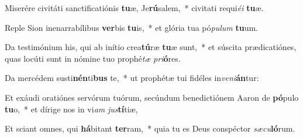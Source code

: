 \item Miserére civitáti sanctificatiónis \textbf{tu}æ, Je\textbf{rú}salem,~* civitati requi\textit{é}\textit{i} \textbf{tu}æ.
\item Reple Sion inenarrabílibus \textbf{ver}bis \textbf{tu}is,~* et glória tua pó\textit{pu}\textit{lum} \textbf{tu}um.
\item Da testimónium his, qui ab inítio crea\textbf{tú}ræ \textbf{tu}æ sunt,~* et súscita prædicatiónes, quas locúti sunt in nómine tuo prophé\textit{tæ} \textit{pri}\textbf{ó}res.
\item Da mercédem susti\textbf{nén}ti\textbf{bus} te,~* ut prophétæ tui fidéles in\textit{ve}\textit{ni}\textbf{án}tur:
\item Et exáudi oratiónes servórum tuórum, secúndum benedictiónem Aaron de \textbf{pó}pulo \textbf{tu}o,~* et dírige nos in vi\textit{am} \textit{jus}\textbf{tí}tiæ,
\item Et sciant omnes, qui \textbf{há}bitant \textbf{ter}ram,~* quia tu es Deus conspéctor \textit{sæ}\textit{cu}\textbf{ló}rum.
